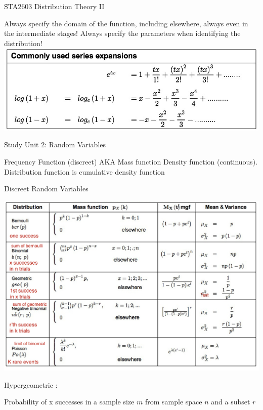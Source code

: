 \documentclass{/out/app/latex/examnotes}
\begin{document}
\obeylines

\h{STA2603 Distribution Theory II}

\ra Always specify the domain of the function, including elsewhere, always even in the intermediate stages!
\ra Always specify the parameters when identifying the distribution!
\vspace{6pt}
\includegraphics[scale=0.5]{./img/expan.jpg}

\h{Study Unit 2: Random Variables}

\ra Frequency Function (discreet) AKA Mass function
\ra Density function (continuous).
\ra Distribution function is cumulative density function

\h{Discreet Random Variables}

\includegraphics[scale=0.5]{./img/disscreet.jpg}

\disobeylines
Hypergeometric :
\obeylines

Probability of x successes in a sample size $m$ from sample space $n$ and a subset $r$  
\end{document}
